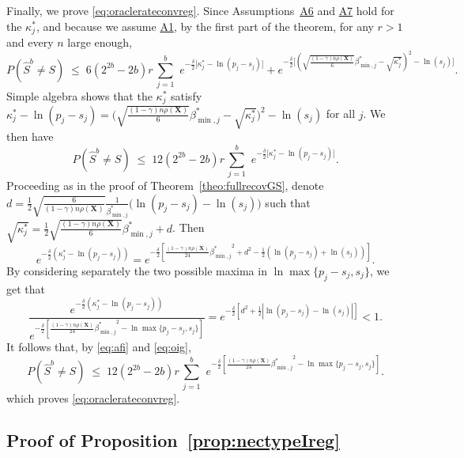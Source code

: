\documentclass[bj,authoryear]{imsart}
\theoremstyle{plain}
\newcommand{\bs}{\boldsymbol}
\begin{document}
Finally, we prove \eqref{eq:oraclerateconvreg}. Since Assumptions~\hyperlink{lab:A6}{A6} and \hyperlink{lab:A7}{A7} hold for the $\kappa^*_j$, and because we assume \hyperlink{lab:A1}{A1}, by the first part of the theorem, for any $r> 1$ and every $n$ large enough,
\begin{equation*}
 P(\hat{S}^{b} \neq S)\;\leq\; 6(2^{2b}-2b)r\,\sum_{j=1}^b\,\, e^{-\tfrac{\delta}{2}\big[\kappa_j^*-\ln(p_j-s_j)\big]} + 
    e^{-\tfrac{\delta}{2}\big[(\sqrt{\frac{(1-\gamma) n\rho(\bs X)}{6}}{\beta_{\min,j}^*} - \sqrt{\kappa_j^*})^2 -\ln(s_j) \big]}.
\end{equation*}
Simple algebra shows that the $\kappa_j^*$ satisfy $\kappa^*_j-\ln(p_j-s_j)=\big(\sqrt{\frac{(1-\gamma) n\rho(\bs X)}{6}}{\beta_{\min,j}^*} - \sqrt{\kappa_j^*}\big)^2 -\ln(s_j)$ for all $j$. We then have
\begin{equation}\label{eq:afi}
 P(\hat{S}^{b} \neq S)\;\leq\; 12(2^{2b}-2b)r\,\sum_{j=1}^b\,\, e^{-\tfrac{\delta}{2}\big[\kappa_j^*-\ln(p_j-s_j)\big]}.
\end{equation}
 Proceeding as in the proof of Theorem~\ref{theo:fullrecovGS}, denote \\$d =\frac12\sqrt{\frac{6}{(1-\gamma) n\rho(\bs X)}}\frac{1}{\beta_{\min,j}^*}\big(\ln({p_j-s_j})-\ln({s_j})\big)$ such that $\sqrt{\kappa^*_j}=  \frac12\sqrt{\frac{(1-\gamma) n\rho(\bs X)}{6}}{\beta_{\min,j}^*} + d$. Then
$$e^{-\frac{\delta}{2}\left(\kappa^*_j-\ln(p_j-s_j)\right)}
=e^{-\frac{\delta}{2}\left[\frac{(1-\gamma) n\rho(\bs X)}{24}{\beta_{\min,j}^*}^2+d^2 - \frac{1}{2}\left(\ln (p_j- s_j)+\ln (s_j)\right)\right]}.$$
By considering separately the two possible maxima in $\ln \max\{p_j-s_j,s_j\}$, we get that
\begin{equation}\label{eq:oig}
    \frac{e^{-\frac{\delta}{2}\left(\kappa^*_j-\ln(p_j-s_j)\right)}}{e^{-\frac{\delta}{2}\left[\frac{(1-\gamma) n\rho(\bs X)}{24}{\beta_{\min,j}^*}^2-\ln \max\{p_j-s_j,s_j\}\right]}}= 
e^{-\frac{\delta}{2}\left[d^2 + \frac{1}{2}\left|\ln (p_j- s_j)-\ln (s_j)\right|\right]} <1.
\end{equation}
It follows that, by \eqref{eq:afi} and \eqref{eq:oig},
$$P(\hat{S}^{b} \neq S) \; \leq \; 12(2^{2b}-2b)r\,\sum_{j=1}^b\,\, e^{-\frac{\delta}{2}\left[\frac{(1-\gamma) n\rho(\bs X)}{24}{\beta_{\min,j}^*}^2-\ln \max\{p_j-s_j,s_j\}\right]}.$$
which proves \eqref{eq:oraclerateconvreg}.

\subsection{Proof of Proposition~\ref{prop:nectypeIreg}}
\end{document}
